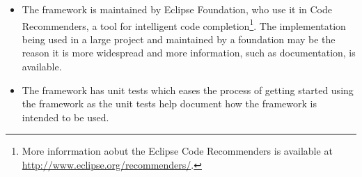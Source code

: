 \begin{itemize}
\item The framework is maintained by Eclipse Foundation, who use it in Code Recommenders, a tool for intelligent code completion\footnote{More inforrmation aobut the Eclipse Code Recommenders is available at \url{http://www.eclipse.org/recommenders/}.}. The implementation being used in a large project and maintained by a foundation may be the reason it is more widespread and more information, such as documentation, is available.
\item The framework  has unit tests which eases the process of getting started using the framework as the unit tests help document how the framework is intended to be used.
\end{itemize}


